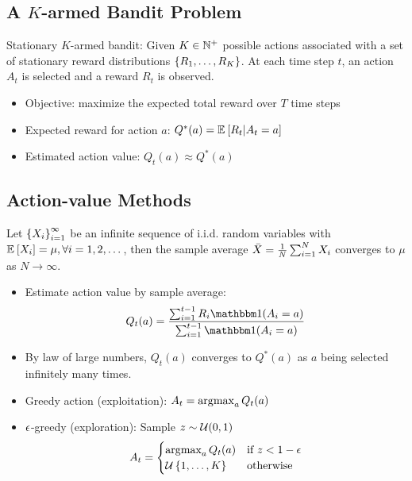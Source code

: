 \subsection{A $K$-armed Bandit Problem}
Stationary $K$-armed bandit: Given $K\in\mathbb{N}^{+}$ possible actions associated with a set of stationary reward distributions $\left\{ {R_1, \dots, R_K} \right\}$. At each time step $t$, an action $A_t$ is selected and a reward $R_t$ is observed. 
\begin{itemize}
    \item Objective: maximize the expected total reward over $T$ time steps
    \item Expected reward for action $a$: $Q^*(a) = \mathbb{E}_{{}} \left[ {R_t} \middle| {A_t = a} \right]$
    \item Estimated action value: $Q_t(a)\approx Q^*(a)$
\end{itemize}

\subsection{Action-value Methods}
\begin{theorem}
    Let $\left\{ {X_i} \right\}_{i=1}^{\infty}$ be an infinite sequence of i.i.d. random variables with $\mathbb{E}_{{}} \left[ {X_i} \right] = \mu, \forall i=1, 2, \dots$, then the sample average $\bar{X}=\frac{1}{ {N} } \sum_{ {i}={1} }^{ {N} } X_i$ converges to $\mu$ as $N\rightarrow\infty$.
\end{theorem}

\begin{itemize}
    \item Estimate action value by sample average: 
        \begin{equation}
            Q_t(a) = \frac{\sum_{i=1}^{t-1}R_i\indicator(A_i = a)}{\sum_{i=1}^{t-1}\indicator(A_i = a)}
        \end{equation}
    \item By law of large numbers, $Q_t(a)$ converges to $Q^*(a)$ as $a$ being selected infinitely many times. 
    \item Greedy action (exploitation): $A_t = \operatorname*{\arg\!\max}_a Q_t(a)$
    \item $\epsilon$-greedy (exploration): Sample $z\sim \mathcal{U}(0, 1)$ 
        \begin{equation}
            A_t = \begin{cases}
                        \operatorname*{\arg\!\max}_a Q_t(a) & \text{if } z < 1 - \epsilon \\
                        \mathcal{U}\left\{ {1, \dots, K} \right\} & \text{otherwise}
                  \end{cases}
        \end{equation}
\end{itemize}

